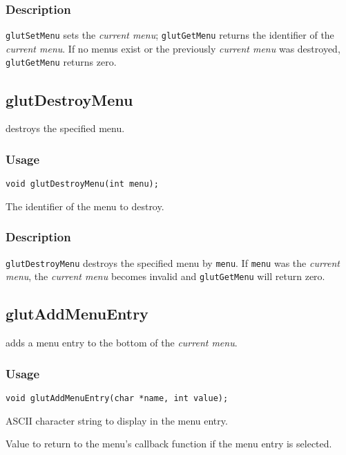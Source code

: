 \subsubsection*{Description}

{\tt glutSetMenu} sets the {\em current menu}; {\tt glutGetMenu} returns the
identifier of the {\em current menu}.
If no menus exist or the previously {\em current menu} was destroyed,
{\tt glutGetMenu} returns zero.

\subsection{glutDestroyMenu}

 destroys the specified menu.

\subsubsection*{Usage}

\begin{verbatim}
void glutDestroyMenu(int menu);
\end{verbatim}
\begin{description}
\itemsep 0in
\item[\tt menu]
The identifier of the menu to destroy.
\end{description}

\subsubsection*{Description}

{\tt glutDestroyMenu} destroys the specified menu by {\tt menu}.  If {\tt menu}
was the {\em current menu}, the {\em current menu} becomes invalid and
{\tt glutGetMenu} will return zero.

\subsection{glutAddMenuEntry}

 adds a menu entry to the bottom of the {\em current menu}.

\subsubsection*{Usage}
\begin{verbatim}
void glutAddMenuEntry(char *name, int value);
\end{verbatim}
\begin{description}
\itemsep 0in
\item[\tt name]
ASCII character string to display in the menu entry.
\item[\tt value]
Value to return to the menu's callback function if the menu entry is selected.
\end{description}

